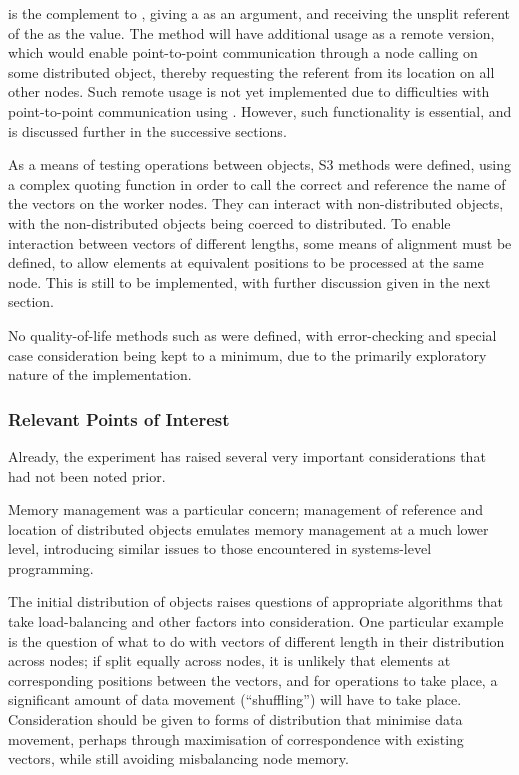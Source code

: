 is the complement to , giving a
 as an argument, and receiving the unsplit
referent of the  as the value.
The method will have additional usage as a remote version, which would enable point-to-point communication through a node calling  on some distributed object, thereby requesting the referent from its location on all other nodes.
Such remote usage is not yet implemented due to difficulties with point-to-point communication using .
However, such functionality is essential, and is discussed further in the successive sections.

As a means of testing operations between  objects, S3  methods were defined, using a complex quoting function in order to call the correct  and reference the name of the vectors on the worker nodes.
They can interact with non-distributed objects, with the non-distributed objects being coerced to distributed.
To enable interaction between vectors of different lengths, some means of alignment must be defined, to allow elements at equivalent positions to be processed at the same node.
This is still to be implemented, with further discussion given in the next section.

No quality-of-life methods such as  were defined, with error-checking and special case consideration being kept to a minimum, due to the primarily exploratory nature of the implementation.

\subsubsection{Relevant Points of Interest}\label{relevant-points-of-interest}

Already, the experiment has raised several very important considerations that had not been noted prior.

Memory management was a particular concern; management of reference and location of distributed objects emulates memory management at a much lower level, introducing similar issues to those encountered in systems-level programming.

The initial distribution of objects raises questions of appropriate algorithms that take load-balancing and other factors into consideration.
One particular example is the question of what to do with vectors of different length in their distribution across nodes; if split equally across nodes, it is unlikely that elements at corresponding positions between the vectors, and for operations to take place, a significant amount of data movement (``shuffling'') will have to take place.
Consideration should be given to forms of distribution that minimise data movement, perhaps through maximisation of correspondence with existing vectors, while still avoiding misbalancing node memory.


